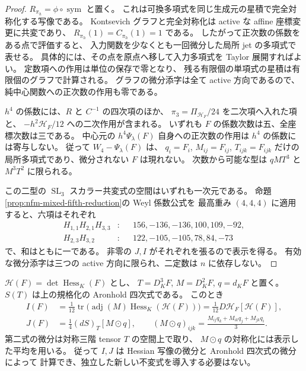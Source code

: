 \begin{proof}
$R_{\pi_h}=\phi\circ\operatorname{sym}$ と置く。
これは可換多項式を同じ生成元の星積で完全対称化する写像である。
Kontsevich グラフと完全対称化は active な affine 座標変更に共変であり、
$R_{\pi_h}(1)=C_{\pi_h}(1)=1$ である。
したがって正次数の係数をある点で評価すると、
入力関数を少なくとも一回微分した局所 jet の多項式で表せる。
具体的には、その点を原点へ移して入力多項式を Taylor 展開すればよい。
定数項への作用は単位の保存で零となり、
残る有限個の単項式の星積は有限個のグラフで計算される。
グラフの微分添字は全て active 方向であるので、
純中心関数への正次数の作用も零である。

$h^4$ の係数には、$R$ と $C^{-1}$ の四次項のほか、
$\pi_3=\Pi_{\mathscr H_F}/24$ を二次項へ入れた項と、
$-h^2\mathscr H_F/12$ への二次作用が含まれる。
いずれも $F$ の係数次数は五、全座標次数は三である。
中心元の $h^4\Psi_\lambda(F)$ 自身への正次数の作用は
$h^4$ の係数には寄与しない。
従って $W_4-\Psi_\lambda(F)$ は、
$q_i=F_i$, $M_{ij}=F_{ij}$, $T_{ijk}=F_{ijk}$
だけの局所多項式であり、微分されない $F$ は現れない。
次数から可能な型は $qMT^3$ と $M^3T^2$ に限られる。

この二型の $\operatorname{SL}_3$ スカラー共変式の空間はいずれも一次元である。
命題\ref{prop:nfm-mixed-fifth-reduction}の Weyl 係数公式を
最高重み $(4,4,4)$ に適用すると、六項はそれぞれ
\[
 \begin{aligned}
 H_{1,1}H_{2,1}H_{3,3}&:
       &&156,-136,-136,100,109,-92,\\
 H_{2,3}H_{3,2}&:
       &&122,-105,-105,78,84,-73
 \end{aligned}
\]
で、和はともに一である。
非零の $J,I$ がそれぞれを張るので表示を得る。
有効な微分添字は三つの active 方向に限られ、二定数は $n$ に依存しない。
\end{proof}

\begin{lemma}
\label{lem:nfm-classical-mixed-covariants}
$\mathscr H(F)=\det\operatorname{Hess}_K(F)$ とし、
$T=D_K^3F$, $M=D_K^2F$, $q=d_KF$ と置く。
$S(T)$ は上の規格化の Aronhold 四次式である。
このとき
\[
 \begin{aligned}
 I(F)
 &=\frac1{12}\operatorname{tr}
       \bigl(\operatorname{adj}(M)\operatorname{Hess}_K(\mathscr H(F))\bigr)
   =\frac1{12}D\mathscr H_F[\mathscr H(F)],\\
 J(F)&=\frac14(dS)_T[M\odot q],\qquad
 (M\odot q)_{ijk}
       =\frac{M_{ij}q_k+M_{ik}q_j+M_{jk}q_i}{3}.
 \end{aligned}
\]
第二式の微分は対称三階 tensor $T$ の空間上で取り、
$M\odot q$ の対称化には表示した平均を用いる。
従って $I,J$ は Hessian 写像の微分と Aronhold 四次式の微分によって
計算でき、独立した新しい不変式を導入する必要はない。
\end{lemma}

